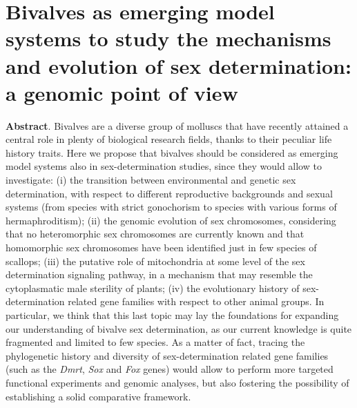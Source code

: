 \documentclass[../main.tex]{subfiles}
\begin{document}
{
\chapter{Bivalves as emerging model systems to study the mechanisms and evolution of sex determination: a genomic point of view}
\label{perspective}


\vspace{5mm}



\vspace{5mm}

}

\vspace{5mm}

\textbf{Abstract}. Bivalves are a diverse group of molluscs that have recently attained a central role in plenty of biological research fields, thanks to their peculiar life history traits. Here we propose that bivalves should be considered as emerging model systems also in sex-determination studies, since they would allow to investigate: (i) the transition between environmental and genetic sex determination, with respect to different reproductive backgrounds and sexual systems (from species with strict gonochorism to species with various forms of hermaphroditism); (ii) the genomic evolution of sex chromosomes, considering that no heteromorphic sex chromosomes are currently known and that homomorphic sex chromosomes have been identified just in few species of scallops; (iii) the putative role of mitochondria at some level of the sex determination signaling pathway, in a mechanism that may resemble the cytoplasmatic male sterility of plants; (iv) the evolutionary history of sex-determination related gene families with respect to other animal groups. In particular, we think that this last topic may lay the foundations for expanding our understanding of bivalve sex determination, as our current knowledge is quite fragmented and limited to few species. As a matter of fact, tracing the phylogenetic history and diversity of sex-determination related gene families (such as the \textit{Dmrt}, \textit{Sox} and \textit{Fox} genes) would allow to perform more targeted functional experiments and genomic analyses, but also fostering the possibility of establishing a solid comparative framework.
\end{document}
